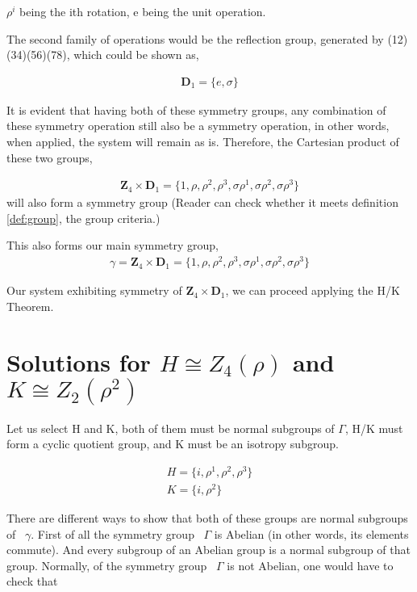 $\rho^i$ being the ith rotation, e being the unit operation.

The second family of operations would be the reflection group, generated by (12)(34)(56)(78), which could be shown as,

\begin{align}
\mathbf{D}_1 = \{e , \sigma\}
\end{align}

It is evident that having both of these symmetry groups, any combination of these symmetry operation still also be a symmetry operation, in other words, when applied, the system will remain as is. Therefore, the Cartesian product of these two groups,

\begin{align}
\mathbf{Z}_4 \times \mathbf{D}_1 = \{1, \rho , \rho^2, \rho^3,  \sigma \rho^1 , \sigma \rho^2, \sigma\rho^3\}
\end{align}
%
will also form a symmetry group (Reader can check whether it meets definition \ref{def:group}, the group criteria.) 

This also forms our main symmetry group, 
\begin{align}
\gamma  = \mathbf{Z}_4 \times \mathbf{D}_1 = \{1, \rho , \rho^2, \rho^3,  \sigma \rho^1 , \sigma \rho^2, \sigma\rho^3\}
\end{align}

Our system exhibiting symmetry of $\mathbf{Z}_4 \times \mathbf{D}_1$, we can proceed applying the H/K Theorem. 

\section{Solutions for $H \cong Z_4(\rho)$ and $K \cong Z_2(\rho^2)$}

Let us select H and K, both of them must be normal subgroups of $\Gamma $, H/K must form a cyclic quotient group, and K must be an isotropy subgroup. 

\begin{align}
H = \{ i , \rho^1 ,\rho^2 ,\rho^3 \} \\
K = \{ i , \rho^2 \}
\end{align}

There are different ways to show that both of these groups are normal subgroups of \ $\gamma $. First of all the symmetry group \ $\Gamma $ is Abelian (in other words, its elements commute). And every subgroup of an Abelian group is a normal subgroup of that group. Normally, of the symmetry group \ $\Gamma $ is not Abelian, one would have to check that 

